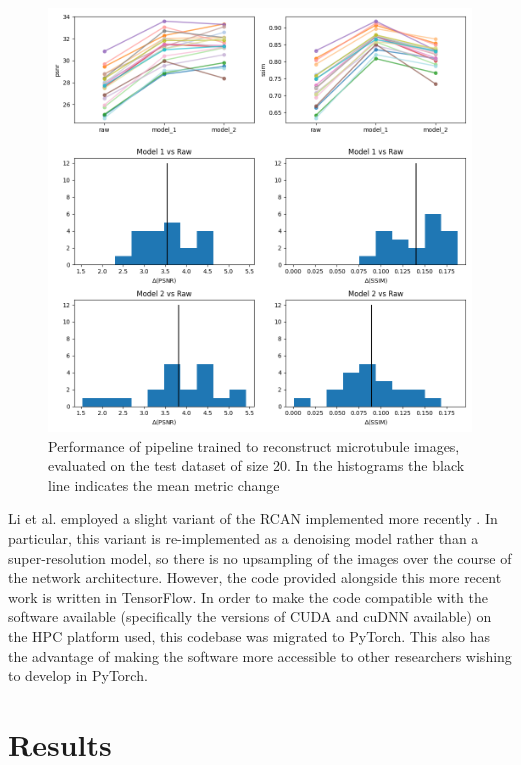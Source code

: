 \documentclass[12pt]{article}
\begin{document}
\begin{figure}[hbtp]
    \includegraphics[scale=0.7, center]{figures/m019_m020_pipeline_stats.png}
    \caption{Performance of pipeline trained to reconstruct microtubule images, evaluated on the test dataset of size 20.
    In the histograms the black line indicates the mean metric change}
    \label{fig:m019_m020_pipeline_stats}
\end{figure}

Li et al. employed a slight variant of the RCAN implemented more recently \cite{rcan2021}.
In particular, this variant is re-implemented as a denoising model rather than a super-resolution model,
so there is no upsampling of the images over the course of the network architecture.
However, the code provided alongside this more recent work is written in TensorFlow.
In order to make the code compatible with the software available (specifically the versions of CUDA and cuDNN available) on the HPC platform used,
this codebase was migrated to PyTorch.
This also has the advantage of making the software more accessible to other researchers wishing to develop in PyTorch.

\section{Results}
\end{document}
